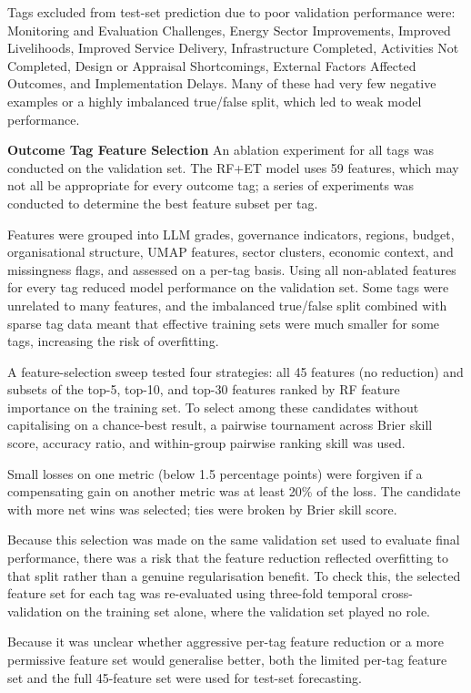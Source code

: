 \documentclass[12pt,a4paper]{article}
\begin{document}
Tags excluded from test-set prediction due to poor validation performance were: Monitoring and Evaluation Challenges, Energy Sector Improvements, Improved Livelihoods, Improved Service Delivery, Infrastructure Completed, Activities Not Completed, Design or Appraisal Shortcomings, External Factors Affected Outcomes, and Implementation Delays. Many of these had very few negative examples or a highly imbalanced true/false split, which led to weak model performance.


\textbf{Outcome Tag Feature Selection}
An ablation experiment for all tags was conducted on the validation set. The RF+ET model uses 59 features, which may not all be appropriate for every outcome tag; a series of experiments was conducted to determine the best feature subset per tag.

Features were grouped into LLM grades, governance indicators, regions, budget, organisational structure, UMAP features, sector clusters, economic context, and missingness flags, and assessed on a per-tag basis. Using all non-ablated features for every tag reduced model performance on the validation set. Some tags were unrelated to many features, and the imbalanced true/false split combined with sparse tag data meant that effective training sets were much smaller for some tags, increasing the risk of overfitting.

A feature-selection sweep tested four strategies: all 45 features (no reduction) and subsets of the top-5, top-10, and top-30 features ranked by RF feature importance on the training set. To select among these candidates without capitalising on a chance-best result, a pairwise tournament across Brier skill score, accuracy ratio, and within-group pairwise ranking skill was used.

Small losses on one metric (below 1.5 percentage points) were forgiven if a compensating gain on another metric was at least 20\% of the loss. The candidate with more net wins was selected; ties were broken by Brier skill score.

Because this selection was made on the same validation set used to evaluate final performance, there was a risk that the feature reduction reflected overfitting to that split rather than a genuine regularisation benefit. To check this, the selected feature set for each tag was re-evaluated using three-fold temporal cross-validation on the training set alone, where the validation set played no role.

Because it was unclear whether aggressive per-tag feature reduction or a more permissive feature set would generalise better, both the limited per-tag feature set and the full 45-feature set were used for test-set forecasting.
\end{document}
